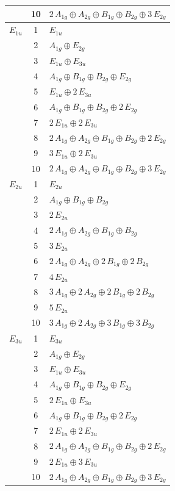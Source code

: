 \documentclass[11pt]{article}
\begin{document}
\begin{longtable}{l c p{}}
 & 10 & $2\,A_{1g}\oplus A_{2g}\oplus B_{1g}\oplus B_{2g}\oplus 3\,E_{2g}$\\
\hline
$E_{1u}$ & 1 & $E_{1u}$\\
 & 2 & $A_{1g}\oplus E_{2g}$\\
 & 3 & $E_{1u}\oplus E_{3u}$\\
 & 4 & $A_{1g}\oplus B_{1g}\oplus B_{2g}\oplus E_{2g}$\\
 & 5 & $E_{1u}\oplus 2\,E_{3u}$\\
 & 6 & $A_{1g}\oplus B_{1g}\oplus B_{2g}\oplus 2\,E_{2g}$\\
 & 7 & $2\,E_{1u}\oplus 2\,E_{3u}$\\
 & 8 & $2\,A_{1g}\oplus A_{2g}\oplus B_{1g}\oplus B_{2g}\oplus 2\,E_{2g}$\\
 & 9 & $3\,E_{1u}\oplus 2\,E_{3u}$\\
 & 10 & $2\,A_{1g}\oplus A_{2g}\oplus B_{1g}\oplus B_{2g}\oplus 3\,E_{2g}$\\
\hline
$E_{2u}$ & 1 & $E_{2u}$\\
 & 2 & $A_{1g}\oplus B_{1g}\oplus B_{2g}$\\
 & 3 & $2\,E_{2u}$\\
 & 4 & $2\,A_{1g}\oplus A_{2g}\oplus B_{1g}\oplus B_{2g}$\\
 & 5 & $3\,E_{2u}$\\
 & 6 & $2\,A_{1g}\oplus A_{2g}\oplus 2\,B_{1g}\oplus 2\,B_{2g}$\\
 & 7 & $4\,E_{2u}$\\
 & 8 & $3\,A_{1g}\oplus 2\,A_{2g}\oplus 2\,B_{1g}\oplus 2\,B_{2g}$\\
 & 9 & $5\,E_{2u}$\\
 & 10 & $3\,A_{1g}\oplus 2\,A_{2g}\oplus 3\,B_{1g}\oplus 3\,B_{2g}$\\
\hline
$E_{3u}$ & 1 & $E_{3u}$\\
 & 2 & $A_{1g}\oplus E_{2g}$\\
 & 3 & $E_{1u}\oplus E_{3u}$\\
 & 4 & $A_{1g}\oplus B_{1g}\oplus B_{2g}\oplus E_{2g}$\\
 & 5 & $2\,E_{1u}\oplus E_{3u}$\\
 & 6 & $A_{1g}\oplus B_{1g}\oplus B_{2g}\oplus 2\,E_{2g}$\\
 & 7 & $2\,E_{1u}\oplus 2\,E_{3u}$\\
 & 8 & $2\,A_{1g}\oplus A_{2g}\oplus B_{1g}\oplus B_{2g}\oplus 2\,E_{2g}$\\
 & 9 & $2\,E_{1u}\oplus 3\,E_{3u}$\\
 & 10 & $2\,A_{1g}\oplus A_{2g}\oplus B_{1g}\oplus B_{2g}\oplus 3\,E_{2g}$\\
\hline
\end{longtable}
\end{document}
